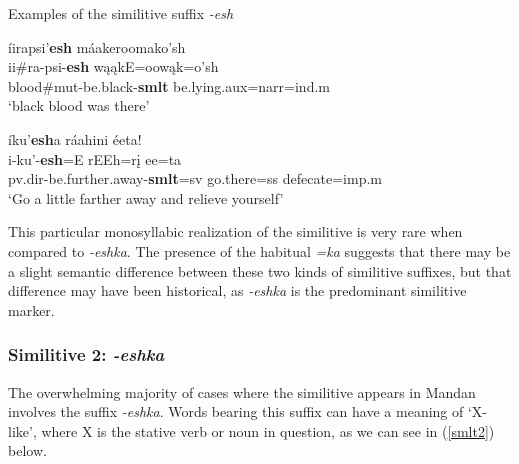 \begin{exe}
\item\label{smlt1} Examples of the similitive suffix \textit{-esh}

	\begin{xlist}
	
	\item \glll íirapsi'\textbf{esh} máakeroomako'sh\\
	ii\#ra-psi-\textbf{esh} wąąkE=oowąk=o'sh\\
	\textnormal{blood}\#mut-\textnormal{be.black}-\textbf{smlt} \textnormal{be.lying}.aux=narr=ind.m\\
	\glt `black blood was there' \citep[132]{hollow1973a}
	
	\item \glll íku'\textbf{esh}a ráahini éeta!\\
	i-ku'-\textbf{esh}=E rEEh=rį ee=ta\\
	pv.dir-\textnormal{be.further.away}-\textbf{smlt}=sv \textnormal{go.there}=ss \textnormal{defecate}=imp.m\\
	\glt `Go a little farther away and relieve yourself' \citep[11]{hollow1973b}
	
	\end{xlist}

\end{exe}

This particular monosyllabic realization of the similitive is very rare when compared to \textit{-eshka}. The presence of the habitual \textit{=ka} suggests that there may be a slight semantic difference between these two kinds of similitive suffixes, but that difference may have been historical, as \textit{-eshka} is the predominant similitive marker. 

\subsubsection{Similitive 2: \textit{-eshka}}\label{suffixsimilitive2}

The overwhelming majority of cases where the similitive appears in Mandan involves the suffix \textit{-eshka}. Words bearing this suffix can have a meaning of `X-like', where X is the stative verb or noun in question, as we can see in (\ref{smlt2}) below.

